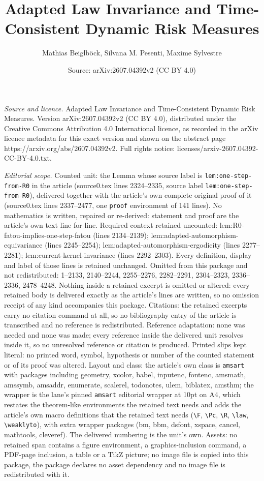 \documentclass[10pt,a4paper]{amsart}
\title[Adapted Law Invariance and Time-Consistent Dynamic Risk Meas]{Adapted Law Invariance and Time-Consistent Dynamic Risk Measures}
\author{Mathias Beiglb\"ock, Silvana M. Pesenti, Maxime Sylvestre}
\date{Source: arXiv:2607.04392v2 (CC BY 4.0)}
\begin{document}
\maketitle

\noindent\emph{Source and licence.} Adapted Law Invariance and Time-Consistent Dynamic Risk Measures. Version arXiv:2607.04392v2 (CC BY 4.0), distributed under the Creative Commons Attribution 4.0 International licence, as recorded in the arXiv licence metadata for this exact version and shown on the abstract page https://arxiv.org/abs/2607.04392v2. Full rights notice: licenses/arxiv-2607.04392-CC-BY-4.0.txt.\par\smallskip

\noindent\textit{Editorial scope.} Counted unit: the Lemma whose source label is \texttt{lem:one-step-from-R0} in the article (source0.tex lines 2324--2335, source label \texttt{lem:one-step-from-R0}), delivered together with the article's own complete original proof of it (source0.tex lines 2337--2477, one \texttt{proof} environment of 141 lines). No mathematics is written, repaired or re-derived: statement and proof are the article's own text line for line. Required context retained uncounted: lem:R0-fatou-implies-one-step-fatou (lines 2134--2139); lem:adapted-automorphism-equivariance (lines 2245--2254); lem:adapted-automorphism-ergodicity (lines 2277--2281); lem:current-kernel-invariance (lines 2292--2303). Every definition, display and label of those lines is retained unchanged. Omitted from this package and not redistributed: 1--2133, 2140--2244, 2255--2276, 2282--2291, 2304--2323, 2336--2336, 2478--4248. Nothing inside a retained excerpt is omitted or altered: every retained body is delivered exactly as the article's lines are written, so no omission receipt of any kind accompanies this package. Citations: the retained excerpts carry no citation command at all, so no bibliography entry of the article is transcribed and no reference is redistributed. Reference adaptation: none was needed and none was made; every reference inside the delivered unit resolves inside it, so no unresolved reference or citation is produced. Printed slips kept literal: no printed word, symbol, hypothesis or number of the counted statement or of its proof was altered. Layout and class: the article's own class is \texttt{amsart} with packages including geometry, xcolor, babel, inputenc, fontenc, amsmath, amssymb, amsaddr, enumerate, scalerel, todonotes, ulem, biblatex, amsthm; the wrapper is the lane's pinned \texttt{amsart} editorial wrapper at 10pt on A4, which restates the theorem-like environments the retained text needs and adds the article's own macro definitions that the retained text needs (\texttt{\textbackslash F}, \texttt{\textbackslash Pc}, \texttt{\textbackslash R}, \texttt{\textbackslash law}, \texttt{\textbackslash weaklyto}), with extra wrapper packages (bm, bbm, dsfont, xspace, cancel, mathtools, cleveref). The delivered numbering is the unit's own. Assets: no retained span contains a figure environment, a graphics-inclusion command, a PDF-page inclusion, a table or a TikZ picture; no image file is copied into this package, the package declares no asset dependency and no image file is redistributed with it. 
\end{document}
